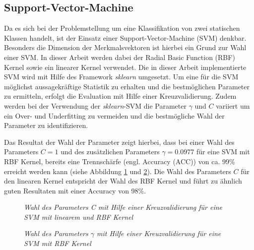 \subsection{Support-Vector-Machine}
Da es sich bei der Problemstellung um eine Klassifikation von zwei statischen Klassen handelt, ist der Einsatz einer Support-Vector-Machine (SVM) denkbar. Besonders die Dimension der Merkmalsvektoren ist hierbei ein Grund zur Wahl einer SVM. In dieser Arbeit werden dabei der \glqq Radial Basic Function\grqq{} (RBF) Kernel sowie ein linearer Kernel verwendet.
Die in dieser Arbeit implementierte SVM wird mit Hilfe des Framework \textit{sklearn} umgesetzt. Um eine für die SVM möglichst aussagekräftige Statistik zu erhalten und die bestmöglichen Parameter zu ermitteln, erfolgt die Evaluation mit Hilfe einer Kreuzvalidierung. Zudem werden bei der Verwendung der \textit{sklearn}-SVM die Parameter $\gamma$ und $C$ variiert um ein Over- und Underfitting zu vermeiden und die bestmögliche Wahl der Parameter zu identifizieren.

Das Resultat der Wahl der Parameter zeigt hierbei, dass bei einer Wahl des Parameters $C=1$ und des zusätzlichen Parameters $\gamma = 0.0977$ für eine SVM mit RBF Kernel, bereits eine Trennschärfe (engl. \glqq Accuracy\grqq{} (ACC)) von ca. 99\% erreicht werden kann (siehe Abbildung \ref{fig:c_chooseSVM} und \ref{fig:gamma_chooseSVM}). Die Wahl des Parameters $C$ für den linearen Kernel entspricht der Wahl des RBF Kernel und führt zu ähnlich guten Resultaten mit einer Accuracy von 98\%.

\begin{figure}[h!]
\centering

\caption{\em Wahl des Parameters C mit Hilfe einer Kreuzvalidierung für eine SVM mit linearem und RBF Kernel}
\label{fig:c_chooseSVM}
\end{figure}

\begin{figure}[h!]
\centering

\caption{\em Wahl des Parameters $\gamma$ mit Hilfe einer Kreuzvalidierung für eine SVM mit RBF Kernel}
\label{fig:gamma_chooseSVM}
\end{figure}
